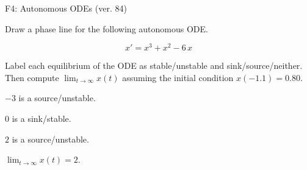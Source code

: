 \begin{exercise}
  \begin{exerciseTitle}F4: Autonomous ODEs (ver. 84)\end{exerciseTitle}
  \begin{exerciseStatement}
    

      Draw a phase line for the following 
      autonomous ODE.
    

    
\[x'= x^{3} + x^{2} - 6 \, x\]

    

      Label each equilibrium of the ODE
      as stable/unstable and sink/source/neither.
      Then compute \(\lim_{t\to\infty}x(t)\)
      assuming the initial condition
      \(x( -1.1 )= 0.80\).
    

  \end{exerciseStatement}
  \begin{exerciseAnswer}
    

      \(-3\) is a source/unstable.
      
        \(0\) is a sink/stable.
      
      \(2\) is a source/unstable.
    

    

      \(\lim_{t\to\infty}x(t)=2\).
    

  \end{exerciseAnswer}
\end{exercise}